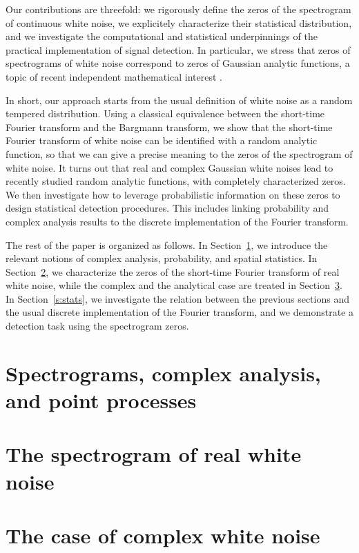\documentclass[a4paper,11pt]{article}
\theoremstyle{plain}
\theoremstyle{remark}
\begin{document}
Our contributions are threefold: we rigorously define the zeros of the
spectrogram of continuous white noise, we explicitely characterize their
statistical distribution, and we investigate the computational and statistical
underpinnings of the practical implementation of signal detection. In
particular, we stress that zeros of spectrograms of white noise correspond to
zeros of Gaussian analytic functions, a topic of recent independent mathematical interest \citep{HKPV09}.

In short, our approach starts from the usual definition of white noise as a random
tempered distribution. Using a classical equivalence between the short-time
Fourier transform and the Bargmann transform, we show that the short-time
Fourier transform of white noise can be identified with a random analytic
function, so that we can give a precise meaning to the zeros of the spectrogram of white
noise. It turns out that real and complex Gaussian white noises lead to
recently studied random analytic functions, with completely characterized zeros. We
then investigate how to leverage probabilistic information on these zeros to design
statistical detection procedures. This includes linking probability and
complex analysis results to the discrete implementation of the Fourier
transform.

The rest of the paper is organized as follows. In Section~\ref{s:preliminary},
we introduce the relevant notions of complex analysis, probability, and spatial
statistics. In Section~\ref{s:real}, we characterize the zeros of the short-time
Fourier transform of real white noise, while the complex and the analytical case
are treated in Section~\ref{s:complex}. In Section~\ref{s:stats}, we investigate
the relation between the previous sections and the usual discrete implementation
of the Fourier transform, and we demonstrate a detection task using the spectrogram zeros.


\section{Spectrograms, complex analysis, and point processes}
\label{s:preliminary}


\section{The spectrogram of real white noise}
\label{s:real}


\section{The case of complex white noise}
\label{s:complex}

\end{document}
